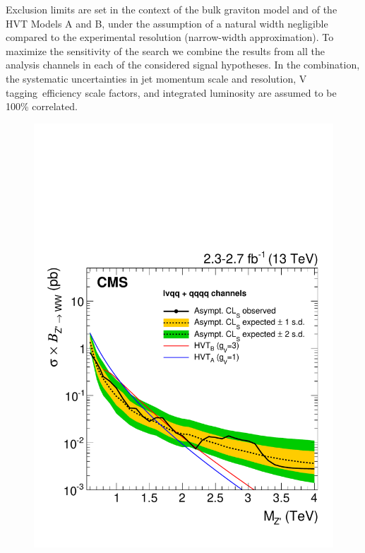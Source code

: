 Exclusion limits are set in the context of the bulk graviton model and of the HVT Models A and B,
under the assumption of a natural width negligible compared to the
experimental resolution (narrow-width approximation).
To maximize the sensitivity of the search we combine the results from all the analysis channels
in each of the considered signal hypotheses. In the combination, the systematic uncertainties in jet momentum scale and resolution, V tagging\
 efficiency scale factors, and integrated luminosity are assumed to be 100\% correlated.

\begin{figure}[!htb]
\centering
     \includegraphics[width=\cmsFigWidth]{B2G-16-004/Figure_006-a.pdf}

\end{figure}
